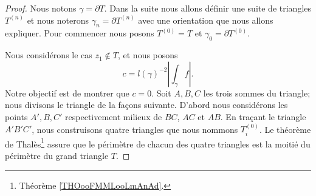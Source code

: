 \begin{proof}
	Nous notons \( \gamma=\partial T\). Dans la suite nous allons définir une suite de triangles \( T^{(n)}\) et nous noterons \( \gamma_n=\partial T^{(n)}\) avec une orientation que nous allons expliquer. Pour commencer nous posons \( T^{(0)}=T\) et \( \gamma_0=\partial T^{(0)}\).

	Nous considérons le cas \( z_1\notin T\), et nous posons
	\begin{equation}
		c=l(\gamma)^{-2}| \int_{\gamma}f |.
	\end{equation}
	Notre objectif est de montrer que \( c=0\). Soit \( A,B,C\) les trois sommes du triangle; nous divisons le triangle de la façons suivante. D'abord nous considérons les points \( A',B,C'\) respectivement milieux de \( BC\), \( AC\) et \( AB\). En traçant le triangle \( A'B'C'\), nous construisons quatre triangles que nous nommons \( T^{(0)}_i\). Le théorème de Thalès\footnote{Théorème \ref{THOooFMMLooLmAnAd}.} assure que le périmètre de chacun des quatre triangles est la moitié du périmètre du grand triangle \( T\).


\end{proof}
